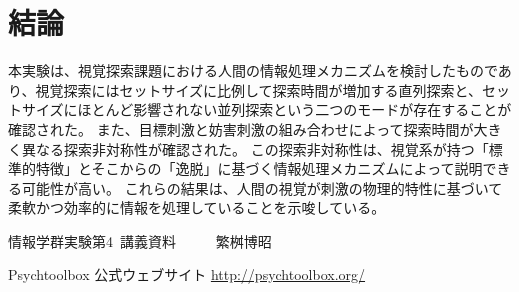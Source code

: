 \documentclass{jlreq}
\begin{document}
\section{結論}
本実験は、視覚探索課題における人間の情報処理メカニズムを検討したものであり、視覚探索にはセットサイズに比例して探索時間が増加する直列探索と、セットサイズにほとんど影響されない並列探索という二つのモードが存在することが確認された。
また、目標刺激と妨害刺激の組み合わせによって探索時間が大きく異なる探索非対称性が確認された。
この探索非対称性は、視覚系が持つ「標準的特徴」とそこからの「逸脱」に基づく情報処理メカニズムによって説明できる可能性が高い。
これらの結果は、人間の視覚が刺激の物理的特性に基づいて柔軟かつ効率的に情報を処理していることを示唆している。

\begin{thebibliography}{9}
情報学群実験第4~講義資料 ~~~~~繁桝博昭

Psychtoolbox 公式ウェブサイト
\url{http://psychtoolbox.org/}
\end{thebibliography}
\end{document}
